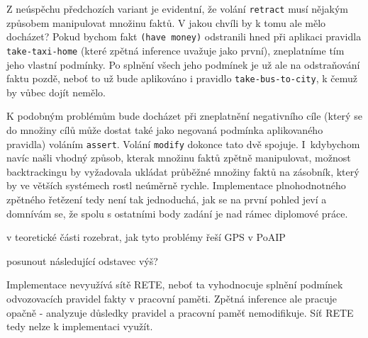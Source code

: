 Z neúspěchu předchozích variant je evidentní, že volání \verb|retract| musí
nějakým způsobem manipulovat množinu faktů. V jakou chvíli by k tomu ale mělo
docházet? Pokud bychom fakt \verb|(have money)| odstranili hned při aplikaci
pravidla \verb|take-taxi-home| (které zpětná inference uvažuje jako první),
zneplatníme tím jeho vlastní podmínky. Po splnění všech jeho podmínek je už ale
na odstraňování faktu pozdě, neboť to už bude aplikováno i pravidlo
\verb|take-bus-to-city|, k čemuž by vůbec dojít nemělo.

K podobným problémům bude docházet při zneplatnění negativního cíle (který se do
množiny cílů může dostat také jako negovaná podmínka aplikovaného pravidla) voláním
\verb|assert|. Volání \verb|modify| dokonce tato dvě spojuje. I~kdybychom navíc
našli vhodný způsob, kterak množinu faktů zpětně manipulovat, možnost
backtrackingu by vyžadovala ukládat průběžné množiny faktů na zásobník, který by
ve větších systémech rostl neúměrně rychle. Implementace plnohodnotného zpětného
řetězení tedy není tak jednoduchá, jak se na první pohled jeví a domnívám se, že
spolu s ostatními body zadání je nad rámec diplomové práce.

\begin{framed}
  v teoretické části rozebrat, jak tyto problémy řeší GPS v PoAIP
\end{framed}

\begin{framed}
  posunout následující odstavec výš?
\end{framed}

Implementace nevyužívá sítě RETE, neboť ta vyhodnocuje splnění podmínek
odvozovacích pravidel fakty v pracovní paměti. Zpětná inference ale pracuje
opačně - analyzuje důsledky pravidel a pracovní paměť nemodifikuje. Síť RETE
tedy nelze k implementaci využít.
